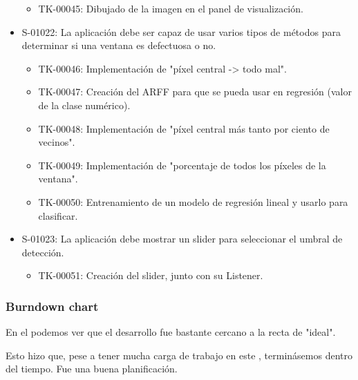 \begin{itemize}
\begin{itemize}
   \item TK-00045: Dibujado de la imagen en el panel de visualización.
  \end{itemize}
 \item S-01022: La aplicación debe ser capaz de usar varios tipos de métodos para determinar si una ventana es defectuosa o no.
  \begin{itemize}
   \item TK-00046: Implementación de "píxel central -> todo mal".
   \item TK-00047: Creación del ARFF para que se pueda usar en regresión (valor de la clase numérico).
   \item TK-00048: Implementación de "píxel central más tanto por ciento de vecinos".
   \item TK-00049: Implementación de "porcentaje de todos los píxeles de la ventana".
   \item TK-00050: Entrenamiento de un modelo de regresión lineal y usarlo para clasificar.
  \end{itemize}
 \item S-01023: La aplicación debe mostrar un slider para seleccionar el umbral de detección.
  \begin{itemize}
   \item TK-00051: Creación del slider, junto con su Listener.
  \end{itemize}
\end{itemize}

\subsubsection*{Burndown chart}
En el \burndownchart{}  podemos ver que el desarrollo fue bastante cercano a la recta de "ideal".


Esto hizo que, pese a tener mucha carga de trabajo en este \sprint{}, terminásemos dentro del tiempo. Fue una buena planificación.

